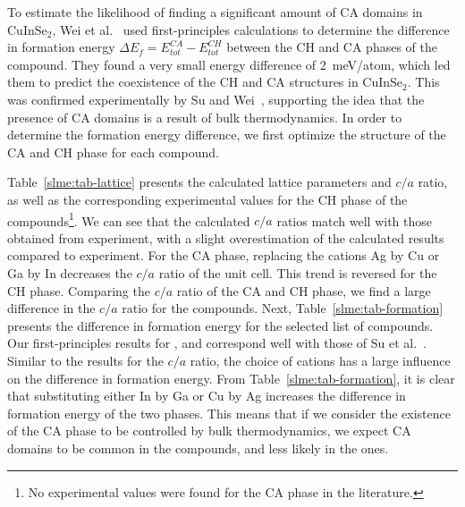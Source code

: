 \begin{refsection}
To estimate the likelihood of finding a significant amount of CA domains in 
CuInSe$_2$, Wei et al.~\cite{Wei1999} used first-principles calculations to 
determine the difference in formation energy $\Delta E_f = E_{tot}^{CA} - 
E_{tot}^{CH}$ between the CH and CA phases of the compound. They found a very 
small energy difference of 2~\si{\milli\electronvolt}/atom, which led them to 
predict the coexistence of the CH and CA structures in CuInSe$_2$. This was 
confirmed experimentally by Su and Wei~\cite{Su1999}, supporting the idea that 
the presence of CA domains is a result of bulk thermodynamics. In order to 
determine the formation energy difference, we first optimize the structure of 
the CA and CH phase for each compound. 
 
Table~\ref{slme:tab-lattice} presents the calculated lattice parameters and 
$c/a$ ratio, as well as the corresponding experimental values 
for the CH phase of the compounds\footnote[3]{No experimental values were 
found for the CA phase in the literature.}. We can see that the calculated 
$c/a$ ratios match well with those obtained from experiment, with a slight overestimation of the calculated results compared to experiment. For the CA phase, 
replacing the cations Ag by Cu or Ga by In decreases the $c/a$ ratio of the 
unit cell. This trend is reversed for the CH phase. Comparing the $c/a$ 
ratio of the CA and CH phase, we find a large difference in the $c/a$ ratio 
for the \mbox{} compounds. Next, Table~\ref{slme:tab-formation} 
presents the difference in formation energy for the selected list of 
compounds. Our first-principles results for ,  and 
 correspond well with those of Su et al.~\cite{Su2000}. Similar to 
the results for the $c/a$ ratio, the choice of cations has a large influence 
on the difference in formation energy. From Table~\ref{slme:tab-formation}, it is
clear that substituting either In by Ga or Cu by Ag increases the difference 
in formation energy of the two phases. This means that if we consider the 
existence of the CA phase to be controlled by bulk thermodynamics, we expect 
CA domains to be common in the \mbox{} compounds, and less likely 
in the \mbox{} ones.  


\end{refsection}
